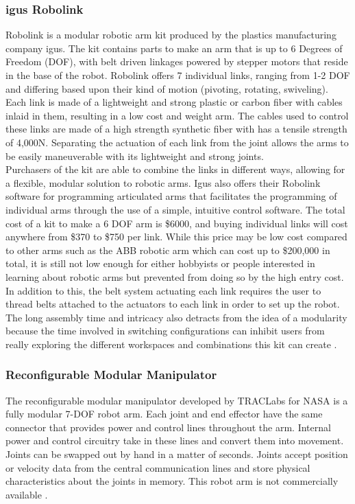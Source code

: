 \subsubsection{igus Robolink} 
Robolink is a modular robotic arm kit produced by the plastics manufacturing company igus. The kit contains parts to make an arm that is up to 6 Degrees of Freedom (DOF), with belt driven linkages powered by stepper motors that reside in the base of the robot. Robolink offers 7 individual links, ranging from 1-2 DOF and differing based upon their kind of motion (pivoting, rotating, swiveling). Each link is made of a lightweight and strong plastic or carbon fiber with cables inlaid in them, resulting in a low cost and weight arm. The cables used to control these links are made of a high strength synthetic fiber with has a tensile strength of 4,000N. Separating the actuation of each link from the joint allows the arms to be easily maneuverable with its lightweight and strong joints. \\
\newline
Purchasers of the kit are able to combine the links in different ways, allowing for a flexible, modular solution to robotic arms. Igus also offers their Robolink software for programming articulated arms that facilitates the programming of individual arms through the use of a simple, intuitive control software. The total cost of a kit to make a 6 DOF arm is \$6000, and buying individual links will cost anywhere from \$370 to \$750 per link. While this price may be low cost compared to other arms such as the ABB robotic arm which can cost up to \$200,000 in total, it is still not low enough for either hobbyists or people interested in learning about robotic arms but prevented from doing so by the high entry cost. In addition to this, the belt system actuating each link requires the user to thread belts attached to the actuators to each link in order to set up the robot. The long assembly time and intricacy also detracts from the idea of a modularity because the time involved in switching configurations can inhibit users from really exploring the different workspaces and combinations this kit can create \cite{igus}. 

\subsubsection{Reconfigurable Modular Manipulator}
The reconfigurable modular manipulator developed by TRACLabs for NASA is a fully modular 7-DOF robot arm. Each joint and end effector have the same connector that provides power and control lines throughout the arm. Internal power and control circuitry take in these lines and convert them into movement. Joints can be swapped out by hand in a matter of seconds. Joints accept position or velocity data from the central communication lines and store physical characteristics about the joints in memory. This robot arm is not commercially available \cite{RMM}.

